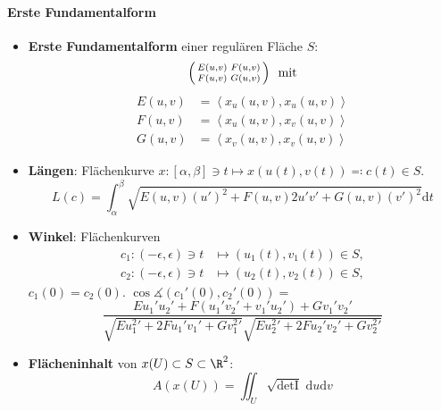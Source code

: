 \paragraph{Erste Fundamentalform}
\begin{itemize}
  \item \textbf{Erste Fundamentalform} einer regulären Fläche \( S \):
  \begin{equation*}
    \left( \begin{smallmatrix}
      E(u,v) & F(u,v) \\ F(u,v) & G(u,v)
    \end{smallmatrix} \right) \enskip \text{mit}
  \end{equation*}
  \begin{align*}
    E(u,v) &= \left\langle x_u(u,v),x_u(u,v) \right\rangle \\
    F(u,v) &= \left\langle x_u(u,v),x_v(u,v) \right\rangle \\
    G(u,v) &= \left\langle x_v(u,v),x_v(u,v) \right\rangle
  \end{align*}
  \item \textbf{Längen}: Flächenkurve \( x: [\alpha,\beta] \ni t \mapsto x(u(t),v(t)) \eqqcolon c(t) \in S \).
  \begin{equation*}
    L(c) = \int_\alpha^\beta \sqrt{E(u,v){(u')}^2 + F(u,v)2u'v' + G(u,v){(v')}^2} \text{d}t
  \end{equation*}
  \item \textbf{Winkel}: Flächenkurven
  \begin{align*}
    c_1 : (-\epsilon, \epsilon) \ni t &\mapsto (u_1(t),v_1(t)) \in S, \\
    c_2 : (-\epsilon, \epsilon) \ni t &\mapsto (u_2(t),v_2(t)) \in S,
  \end{align*}
  \( c_1(0) = c_2(0) \). \( \cos \measuredangle (c_1'(0),c_2'(0)) = \)
  \begin{equation*}
    \frac{Eu_1'u_2' + F(u_1'v_2' + v_1'u_2') + Gv_1'v_2'}{\sqrt{E{u_1^2}'+2Fu_1'v_1' + G{v_1^2}'}\sqrt{E{u_2^2}' + 2Fu_2'v_2' + G{v_2^2}'}}
  \end{equation*}
  \item \textbf{Flächeninhalt} von \( x(U) \subset S \subset \R^2 \):
  \begin{equation*}
    A(x(U)) = \iint_U \sqrt{\det \text{I}}\text{ d}u\text{d}v
  \end{equation*}
\end{itemize}

